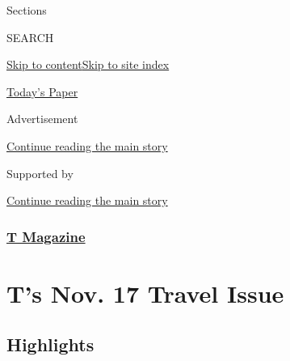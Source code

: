 Sections

SEARCH

\protect\hyperlink{site-content}{Skip to
content}\protect\hyperlink{site-index}{Skip to site index}

\href{https://myaccount.nytimes3xbfgragh.onion/auth/login?response_type=cookie\&client_id=vi}{}

\href{https://www.nytimes3xbfgragh.onion/section/todayspaper}{Today's
Paper}

Advertisement

\protect\hyperlink{after-top}{Continue reading the main story}

Supported by

\protect\hyperlink{after-sponsor}{Continue reading the main story}

\hypertarget{t-magazine}{%
\subsubsection{\texorpdfstring{\href{/section/t-magazine}{T
Magazine}}{T Magazine}}\label{t-magazine}}

\hypertarget{ts-nov-17-travel-issue}{%
\section{T's Nov. 17 Travel Issue}\label{ts-nov-17-travel-issue}}

\hypertarget{highlights}{%
\subsection{Highlights}\label{highlights}}

